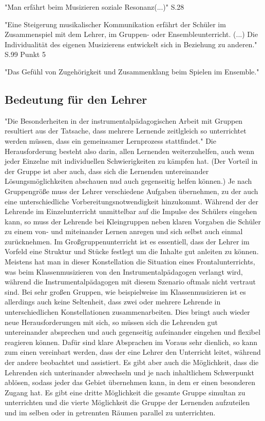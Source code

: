 "Man erfährt beim Musizieren soziale Resonanz(...)" S.28

"Eine Steigerung musikalischer Kommunikation erfährt der Schüler im
Zusammenspiel mit dem Lehrer, im Gruppen- oder Ensembleunterricht. (...) Die Individualität des eigenen Musizierens entwickelt sich in
Beziehung zu
anderen."  S.99 Punkt 5

"Das Gefühl von Zugehörigkeit und Zusammenklang beim Spielen im Ensemble."


\subsection*{Bedeutung für den Lehrer}

"Die Besonderheiten in der instrumentalpädagogischen Arbeit mit Gruppen
resultiert aus der Tatsache, dass mehrere Lernende zeitlgleich so unterrichtet
werden müssen, dass ein gemeinsamer Lernprozess stattfindet."
\autocite[221]{Busch:grundwissen_Instrumentalpädagogik} Die Herausforderung
besteht also darin, allen Lernenden weiterzuhelfen, auch wenn jeder Einzelne mit
individuellen Schwierigkeiten zu kämpfen hat. (Der Vorteil in der Gruppe ist aber
auch, dass sich die Lernenden untereinander Lösungsmöglichkeiten abschauen nud
auch gegenseitig helfen können.) 
Je nach Gruppengröße muss der Lehrer verschiedene Aufgaben übernehmen,
zu der
auch eine unterschiedliche Vorbereitungsnotwendigkeit hinzukommt. Während der
der Lehrende im Einzelunterricht unmittelbar auf die Impulse des Schülers
eingehen kann, so muss der Lehrende bei Kleingruppen neben klaren Vorgaben die
Schüler zu einem von- und miteinander Lernen anregen und sich selbst auch einmal
zurücknehmen. Im Großgruppenunterricht ist es essentiell, dass der Lehrer im
Vorfeld eine Struktur und Stücke festlegt um die Inhalte gut anleiten zu können.\autocite[220]{Busch:grundwissen_Instrumentalpädagogik}
Meistens hat man in dieser Konstellation die Situation eines Frontalunterrichts,
was beim Klassenmusizieren von den Instrumentalpädagogen verlangt wird, während die
Instrumentalpädagogen mit diesem Szenario oftmals nicht vertraut sind. Bei sehr
großen Gruppen, wie beispielweise im
Klassenmusizieren ist es allerdings auch keine Seltenheit, dass zwei oder
mehrere Lehrende in unterschiedlichen Konstellationen zusammenarbeiten. Dies
bringt auch wieder neue Herausforderungen mit sich, so müssen sich die Lehrenden
gut untereinander absprechen und auch gegenseitig aufeinander eingehen und
flexibel reagieren können. Dafür sind klare Absprachen im Voraus sehr dienlich,
so kann zum einen vereinbart werden, dass der eine Lehrer den Unterricht leitet,
während der andere beobachtet und assistiert. Es gibt aber auch die Möglichkeit,
dass die Lehrenden sich unterinander abwechseln und je nach inhaltlichem
Schwerpunkt ablösen, sodass jeder das Gebiet übernehmen kann, in dem er einen
besonderen Zugang hat. Es gibt eine dritte Möglichkeit die gesamte Gruppe
simultan zu unterrichten und die vierte Möglichkeit die Gruppe der Lernenden
aufzuteilen und im selben oder in getrennten Räumen parallel zu unterrichten.
\autocite{cook s. 461} 

